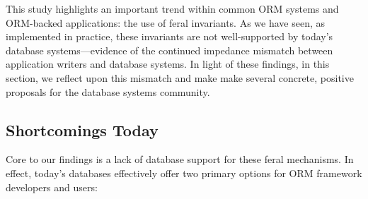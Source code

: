 This study highlights an important trend within common ORM systems and
ORM-backed applications: the use of feral invariants. As we have seen,
as implemented in practice, these invariants are not well-supported by
today's database systems---evidence of the continued impedance
mismatch between application writers and database systems. In light of
these findings, in this section, we reflect upon this mismatch and
make make several concrete, positive proposals for the database
systems community.

\subsection{Shortcomings Today}

Core to our findings is a lack of database support for these
feral mechanisms. In effect, today's databases effectively offer two
primary options for ORM framework developers and users:

